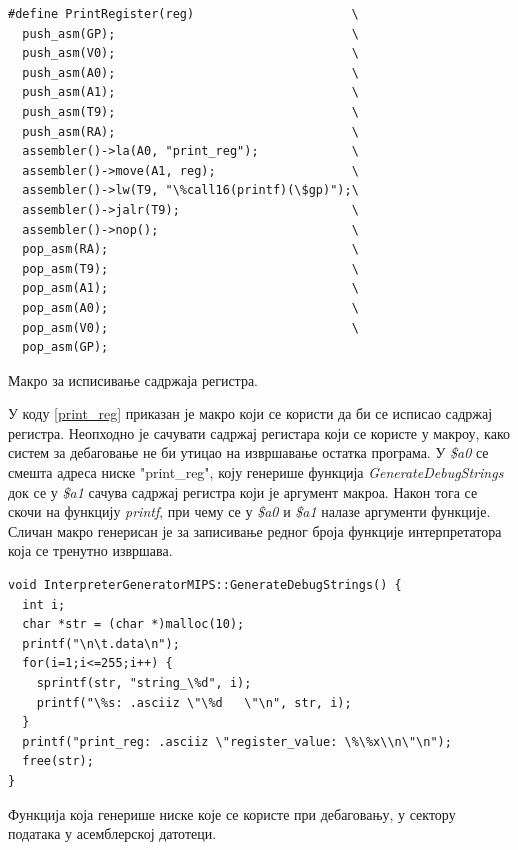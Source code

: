 \documentclass[12pt,oneside]{memoir}
\begin{document}
\begin{listing}
\begin{verbatim}
#define PrintRegister(reg)                      \
  push_asm(GP);                                 \
  push_asm(V0);                                 \
  push_asm(A0);                                 \
  push_asm(A1);                                 \
  push_asm(T9);                                 \
  push_asm(RA);                                 \
  assembler()->la(A0, "print_reg");             \
  assembler()->move(A1, reg);                   \
  assembler()->lw(T9, "\%call16(printf)(\$gp)");\
  assembler()->jalr(T9);                        \
  assembler()->nop();                           \
  pop_asm(RA);                                  \
  pop_asm(T9);                                  \
  pop_asm(A1);                                  \
  pop_asm(A0);                                  \
  pop_asm(V0);                                  \
  pop_asm(GP);                                  
\end{verbatim}
\caption{Макро за исписивање садржаја регистра.}
\label{print_reg}
\end{listing}

У коду \ref{print_reg} приказан је макро који се користи да би се исписао садржај регистра. Неопходно је сачувати садржај регистара који се користе у макроу, како систем за дебаговање не би утицао на извршавање остатка програма. У \textit{\$a0} се смешта адреса ниске "print\_reg", коју генерише функција \textit{GenerateDebugStrings} док се у \textit{\$a1} сачува садржај регистра који је аргумент макроа. Након тога се скочи на функцију \textit{printf}, при чему се у \textit{\$a0} и \textit{\$a1} налазе аргументи функције. Сличан макро генерисан је за записивање редног броја функције интерпретатора која се тренутно извршава.\\

\begin{listing}
\begin{verbatim}
void InterpreterGeneratorMIPS::GenerateDebugStrings() {
  int i;
  char *str = (char *)malloc(10);
  printf("\n\t.data\n");
  for(i=1;i<=255;i++) {
    sprintf(str, "string_\%d", i);
    printf("\%s: .asciiz \"\%d   \"\n", str, i);
  }
  printf("print_reg: .asciiz \"register_value: \%\%x\\n\"\n");
  free(str);
}
\end{verbatim}
\caption{Функција која генерише ниске које се користе при дебаговању, у сектору података у асемблерској датотеци.}
\label{generate_debug_strings}
\end{listing}
\end{document}
